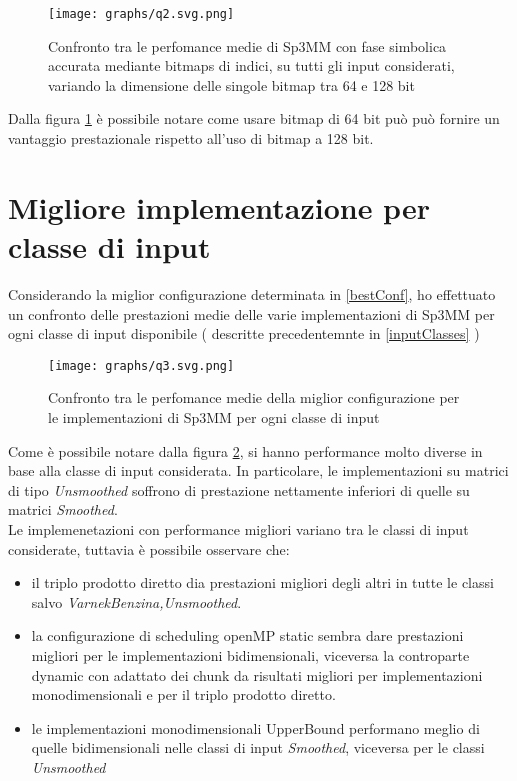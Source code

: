 \begin{figure}[H]
  \centering \texttt{[image: graphs/q2.svg.png]}
  \caption{Confronto tra le perfomance medie di Sp3MM con fase simbolica accurata mediante bitmaps di indici,
		   su tutti gli input considerati, variando la dimensione delle singole bitmap tra 64 e 128 bit}
  \decoRule \label{fig:q2}
\end{figure}
Dalla figura \ref{fig:q2} è possibile notare come usare bitmap di 64 bit può può fornire un vantaggio prestazionale
rispetto all'uso di bitmap a 128 bit.

\section{Migliore implementazione per classe di input} \label{chPerf:q3}
Considerando la miglior configurazione determinata in \ref{bestConf}, ho effettuato un confronto delle prestazioni medie
delle varie implementazioni di Sp3MM per ogni classe di input disponibile ( descritte precedentemnte in \ref{inputClasses} )
\begin{figure}[H]	
  \centering \texttt{[image: graphs/q3.svg.png]}
  \caption{Confronto tra le perfomance medie della miglior configurazione per le implementazioni di Sp3MM per ogni classe di input}
  \label{fig:q3}
\end{figure}
Come è possibile notare dalla figura \ref{fig:q3}, si hanno performance molto diverse in base alla classe di input considerata.
In particolare, le implementazioni su matrici di tipo \emph{Unsmoothed} soffrono di prestazione nettamente inferiori di quelle 
su matrici \emph{Smoothed}.\\
Le implemenetazioni con performance migliori variano tra le classi di input considerate, tuttavia è possibile osservare che:
\begin{itemize}
	\item il triplo prodotto diretto dia prestazioni migliori degli altri in tutte le classi salvo \emph{VarnekBenzina,Unsmoothed}.
	\item la configurazione di scheduling openMP static sembra dare prestazioni migliori per le implementazioni bidimensionali,
		  viceversa la controparte dynamic con adattato dei chunk da risultati migliori per implementazioni monodimensionali e per il triplo prodotto diretto.
	\item le implementazioni monodimensionali UpperBound performano meglio di quelle bidimensionali nelle classi di input \emph{Smoothed},
		  viceversa per le classi \emph{Unsmoothed}
\end{itemize}

